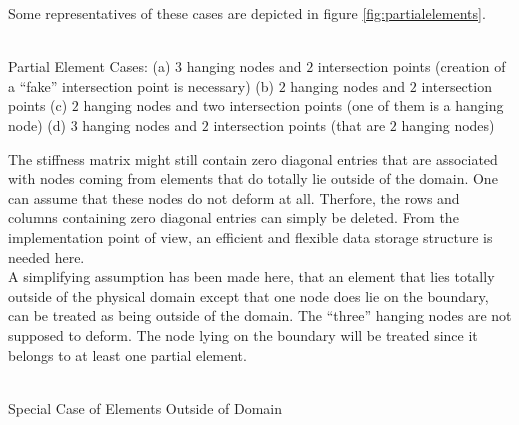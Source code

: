 \documentclass[a4paper,12pt]{article}
\makeatletter
\newenvironment{figurehere}
  {\def\@captype{figure}}
  {}
\makeatother
\begin{document}
Some representatives of these cases are depicted in figure \ref{fig:partialelements}.
\begin{center}
\begin{figurehere} 
\scalebox{0.7}{}\\
\caption{Partial Element Cases: (a) $3$ hanging nodes and $2$ intersection points (creation of a ``fake'' intersection point is necessary) (b) $2$ hanging nodes and $2$ intersection points (c) $2$ hanging nodes and two intersection points (one of them is a hanging node) (d) $3$ hanging nodes and $2$ intersection points (that are $2$ hanging nodes)}\label{fig:partialelements}
\end{figurehere}
\end{center}

The stiffness matrix might still contain zero diagonal entries that are associated with nodes coming from elements that do totally lie outside of the domain. One can assume that these nodes do not deform at all. Therfore, the rows and columns  containing zero diagonal entries can simply be deleted. From the implementation point of view, an efficient and flexible data storage structure is needed here. \\
A simplifying assumption has been made here, that an element that lies totally outside of the physical domain except that one node does lie on the boundary, can be treated as being outside of the domain. The ``three'' hanging nodes are not supposed to deform. The node lying on the boundary will be treated since it belongs to at least one partial element. 
\begin{center}
\begin{figurehere} 
\\
\caption{Special Case of Elements Outside of Domain}\label{fig:specialcase}
\end{figurehere}
\end{center}
\end{document}
